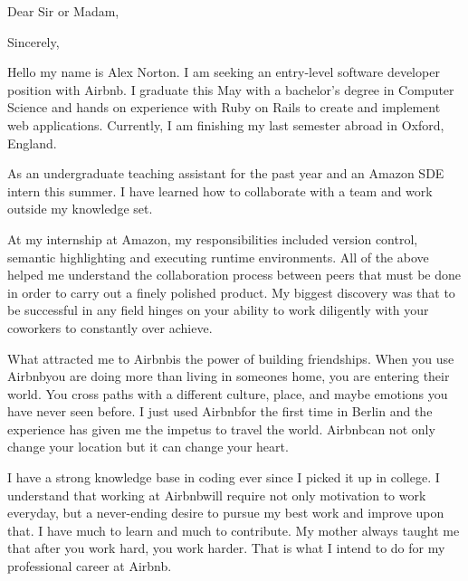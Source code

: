 \documentclass{my_cv}
\begin{document}
\newcommand{\companyName}{Airbnb}
\recipient{\companyName \ Recruitment team}{\companyName }
\date{\today}
\opening{Dear Sir or Madam,}
\closing{Sincerely,}
\makelettertitle


\indent Hello my name is Alex Norton.   I am seeking an entry-level software developer
position with \companyName.   I graduate this May with a bachelor’s degree in
Computer Science and hands on experience with Ruby on Rails to create and
implement web applications.  Currently, I am finishing my last semester abroad
in Oxford, England. 

As an undergraduate teaching assistant for the past year and an Amazon SDE
intern this summer.  I have learned how to collaborate with a team and work
outside my knowledge set.

At my internship at Amazon, my responsibilities included version control,
semantic highlighting and executing runtime environments.  All of the above
helped me understand the collaboration process between peers that must be
done in order to carry out a finely polished product.  My biggest discovery
was that to be successful in any field hinges on your ability to work
diligently with your coworkers to constantly over achieve.

What attracted me to \companyName is the power of building friendships.  When
you use \companyName you are doing more than living in someones home, you are
entering their world.  You cross paths with a different culture, place, and
maybe emotions you have never seen before.  I just used \companyName for the
first time in Berlin and the experience has given me the impetus to travel the
world.  \companyName can not only change your location but it can change your
heart.

I have a strong knowledge base in coding ever since I picked it up in
college.  I understand that working at \companyName will require not only
motivation to work everyday, but a never-ending desire to pursue my best
work and improve upon that.  I have much to learn and much to
contribute.  My mother always taught me that after you work hard, you
work harder.  That is what I intend to do for my professional career at
\companyName.
\end{document}
